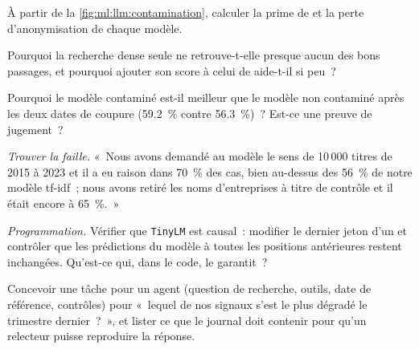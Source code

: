 \begin{exercise}[$\star$]\label{exo:ml:large-language-models-in-finance:3}
À partir de la \cref{fig:ml:llm:contamination}, calculer la prime de  et la perte d'anonymisation de chaque modèle.
\end{exercise}

\begin{exercise}[$\star\star$]\label{exo:ml:large-language-models-in-finance:4}
Pourquoi la recherche dense seule ne retrouve-t-elle presque aucun des bons passages, et pourquoi ajouter son score à celui de  aide-t-il si
peu~?
\end{exercise}

\begin{exercise}[$\star\star$]\label{exo:ml:large-language-models-in-finance:5}
Pourquoi le modèle contaminé est-il meilleur que le modèle non contaminé après les deux dates de coupure (59.2~\% contre 56.3~\%)~? Est-ce une preuve de
jugement~?
\end{exercise}

\begin{exercise}[$\star\star$]\label{exo:ml:large-language-models-in-finance:6}
\emph{Trouver la faille.} «~Nous avons demandé au modèle le sens de 10\,000 titres de 2015 à 2023 et il a eu raison dans 70~\% des
cas, bien au-dessus des 56~\% de notre modèle tf-idf~; nous avons retiré les noms d'entreprises à titre de contrôle et il était encore à 65~\%.~»
\end{exercise}

\begin{exercise}[$\star\star\star$]\label{exo:ml:large-language-models-in-finance:7}
\emph{Programmation.} Vérifier que \texttt{TinyLM} est causal~: modifier le dernier jeton d'un  et contrôler que les prédictions du
modèle à toutes les positions antérieures restent inchangées. Qu'est-ce qui, dans le code, le garantit~?
\end{exercise}

\begin{exercise}[$\star\star\star$]\label{exo:ml:large-language-models-in-finance:8}
Concevoir une tâche pour un agent (question de recherche, outils, date de référence, contrôles) pour «~lequel de nos signaux s'est le plus dégradé le trimestre dernier~?~»,
et lister ce que le journal doit contenir pour qu'un relecteur puisse reproduire la réponse.
\end{exercise}

